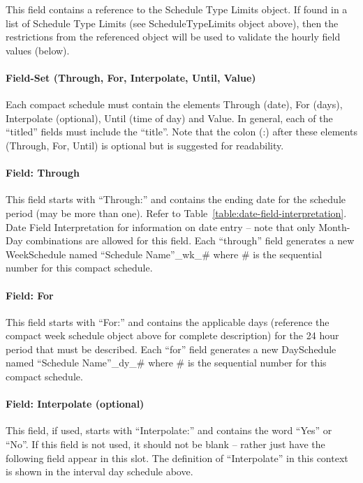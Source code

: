 This field contains a reference to the Schedule Type Limits object. If found in a list of Schedule Type Limits (see ScheduleTypeLimits object above), then the restrictions from the referenced object will be used to validate the hourly field values (below).

\paragraph{Field-Set (Through, For, Interpolate, Until, Value)}\label{field-set-through-for-interpolate-until-value}

Each compact schedule must contain the elements Through (date), For (days), Interpolate (optional), Until (time of day) and Value. In general, each of the ``titled'' fields must include the ``title''. Note that the colon (:) after these elements (Through, For, Until) is optional but is suggested for readability.

\paragraph{Field: Through}\label{field-through}

This field starts with ``Through:'' and contains the ending date for the schedule period (may be more than one). Refer to Table~\ref{table:date-field-interpretation}. Date Field Interpretation for information on date entry -- note that only Month-Day combinations are allowed for this field. Each ``through'' field generates a new WeekSchedule named ``Schedule Name''\_wk\_\# where \# is the sequential number for this compact schedule.

\paragraph{Field: For}\label{field-for}

This field starts with ``For:'' and contains the applicable days (reference the compact week schedule object above for complete description) for the 24 hour period that must be described. Each ``for'' field generates a new DaySchedule named ``Schedule Name''\_dy\_\# where \# is the sequential number for this compact schedule.

\paragraph{Field: Interpolate (optional)}\label{field-interpolate-optional}

This field, if used, starts with ``Interpolate:'' and contains the word ``Yes'' or ``No''. If this field is not used, it should not be blank -- rather just have the following field appear in this slot. The definition of ``Interpolate'' in this context is shown in the interval day schedule above.

